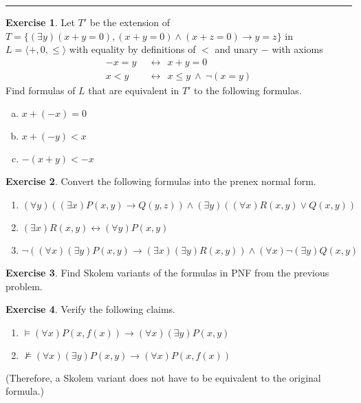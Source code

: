 \documentclass[11pt,a4paper]{amsart}
\theoremstyle{definition}
\newtheorem{problem}{Exercise}
\theoremstyle{remark}
\begin{document}
\smallskip
\hrule

\begin{problem}
Let $T'$ be the extension of $T=\{(\exists y)(x+y=0),(x+y=0)\wedge (x+z=0)\rightarrow y=z\}$ in $L=\langle +,0,\le\rangle$ with equality by definitions of $<$ and unary $-$ with axioms
\begin{align*}
-x=y\ \ &\leftrightarrow\ \ x+y=0\\
x<y\ \ &\leftrightarrow\ \ x\le y\ \wedge\ \neg(x=y)
\end{align*}
Find formulas of $L$ that are equivalent in $T'$ to the following formulas.
\begin{enumerate}[(a)]
\itemsep6pt
\item $x+(-x)=0$
\item $x+(-y)<x$
\item $-(x+y)<-x$
\end{enumerate}
\end{problem}



\begin{problem} Convert the following formulas into the prenex normal form.
\begin{enumerate}
\itemsep6pt
\item $(\forall y)((\exists x)P(x,y)\to Q(y,z))\wedge (\exists y)((\forall x)R(x,y)\vee Q(x,y))$
\item $(\exists x)R(x,y)\leftrightarrow (\forall y)P(x,y)$
\item $\neg((\forall x)(\exists y)P(x,y)\to (\exists x)(\exists y)R(x,y))\wedge(\forall x)\neg(\exists y)Q(x,y)$
\end{enumerate}
\end{problem}


\begin{problem} Find Skolem variants of the formulas in PNF from the previous problem.
\end{problem}


\begin{problem}Verify the following claims.
\begin{enumerate}
\itemsep6pt
\item $\models (\forall x)P(x,f(x)) \to (\forall x)(\exists y)P(x,y)$
\item $\not\models (\forall x)(\exists y)P(x,y)\to (\forall x)P(x,f(x))$
\end{enumerate}
(Therefore, a Skolem variant does not have to be equivalent to the original formula.)
\end{problem}
\end{document}
